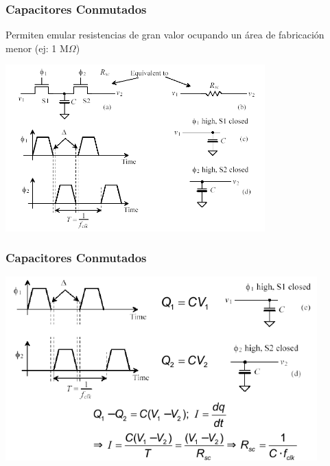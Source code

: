 \documentclass[aspectratio=169,10pt]{beamer}
\begin{document}
\begin{frame}[t]
\frametitle{Capacitores Conmutados}
Permiten emular resistencias de gran valor ocupando un área de fabricación menor (ej: 1 M$\Omega$)

\centering\vspace{5mm}
\includegraphics[width=10cm]{swcap}
\end{frame}


\begin{frame}[t]
\frametitle{Capacitores Conmutados}
\centering
\includegraphics[width=12cm]{swcap2}
\end{frame}
\end{document}
